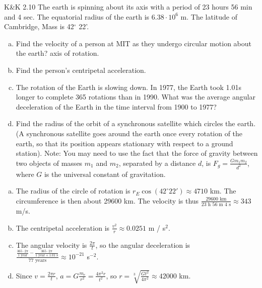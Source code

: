 \documentclass{esg8012pset}
\begin{document}
\begin{problem}{K\&K 2.10}
  The earth is spinning about its axis with a period of 23 hours 56 min and 4 sec. The equatorial radius of the earth is $6.38\cdot 10^{6}$ m. The latitude of Cambridge, Mass is 42$^{\circ}$ 22'.
  \begin{enumerate}[a)]
    \item Find the velocity of a person at MIT as they undergo circular motion about the earth? axis of rotation.
    \item Find the person's centripetal acceleration.
    \item The rotation of the Earth is slowing down. In 1977, the Earth took 1.01s longer to complete 365 rotations than in 1990. What was the average angular deceleration of the Earth in the time interval from 1900 to 1977?
    \item Find the radius of the orbit of a synchronous satellite which circles the earth. (A synchronous satellite goes around the earth once every rotation of the earth, so that its position appears stationary with respect to a ground station).  Note: You may need to use the fact that the force of gravity between two objects of masses $m_1$ and $m_2$, separated by a distance $d$, is $F_g = \frac{G m_1 m_2}{d^2}$, where $G$ is the universal constant of gravitation.
  \end{enumerate}
\end{problem}
\begin{solution}
  \begin{enumerate}[a)]
    \item The radius of the circle of rotation is $r_E \cos(42^{\circ} 22') \approx 4710$ km.  The circumference is then about 29600 km.  The velocity is thus $\frac{29600\text{ km}}{23\text{ h }56\text{ m }4\text{ s}} \approx 343$ m/s.
    \item The centripetal acceleration is $\frac{v^2}{r} \approx 0.0251$ m / s$^2$.
    \item The angular velocity is $\frac{2\pi}{t}$, so the angular deceleration is $\frac{\frac{365\cdot 2\pi}{1\text{ year}} - \frac{365\cdot 2\pi}{1\text{ year}+1.01\text{ s}}}{77\text{ years}} \approx 10^{-21}$ s$^{-2}$. 
    \item Since $v = \frac{2\pi r}{t}$, $a = G\frac{m_e}{r^2} = \frac{4\pi^2 r}{t^2}$, so $r = \sqrt[3]{\frac{G t^2}{4\pi^2}} \approx 42000$ km.
  \end{enumerate}
\end{solution}
\end{document}
